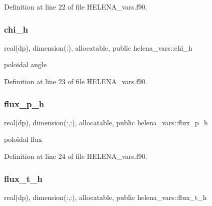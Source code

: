 Definition at line 22 of file H\+E\+L\+E\+N\+A\+\_\+vars.\+f90.

\mbox{\label{namespacehelena__vars_aaaa83af362a93836b4dc74bdfa715d1a}} 
\subsubsection{\texorpdfstring{chi\+\_\+h}{chi\_h}}
{\footnotesize\ttfamily real(dp), dimension(\+:), allocatable, public helena\+\_\+vars\+::chi\+\_\+h}



poloidal angle 



Definition at line 23 of file H\+E\+L\+E\+N\+A\+\_\+vars.\+f90.

\mbox{\label{namespacehelena__vars_ab84791cf288fa3209eafb797479d1e47}} 
\subsubsection{\texorpdfstring{flux\+\_\+p\+\_\+h}{flux\_p\_h}}
{\footnotesize\ttfamily real(dp), dimension(\+:,\+:), allocatable, public helena\+\_\+vars\+::flux\+\_\+p\+\_\+h}



poloidal flux 



Definition at line 24 of file H\+E\+L\+E\+N\+A\+\_\+vars.\+f90.

\mbox{\label{namespacehelena__vars_af28db18d415da215cae4d9ec9f60e18b}} 
\subsubsection{\texorpdfstring{flux\+\_\+t\+\_\+h}{flux\_t\_h}}
{\footnotesize\ttfamily real(dp), dimension(\+:,\+:), allocatable, public helena\+\_\+vars\+::flux\+\_\+t\+\_\+h}



